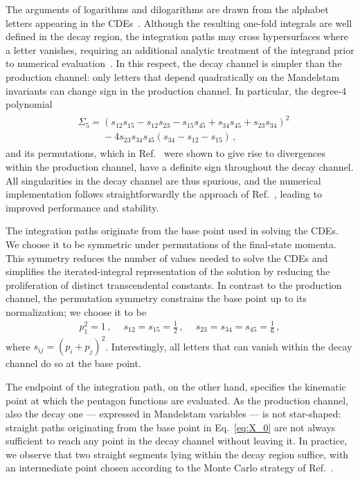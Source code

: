 \documentclass[10pt,aps,prl,superscriptaddress,twocolumn,preprintnumbers,nofootinbib]{revtex4-2}
\begin{document}
The arguments of logarithms and dilogarithms are drawn from the alphabet letters appearing in the CDEs~\cite{Duhr:2011zq}. Although the resulting one-fold integrals are well defined in the decay region, the integration paths may cross hypersurfaces where a letter vanishes, requiring an additional analytic treatment of the integrand prior to numerical evaluation~\cite{Chicherin:2021dyp}.
In this respect, the decay channel is simpler than the production channel: only letters that depend quadratically on the Mandelstam invariants can change sign in the production channel.
In particular, the degree-4 polynomial
\begin{align}
\begin{aligned}
& \Sigma_5 = (s_{12} s_{15} - s_{12} s_{23} - s_{15} s_{45} + s_{34} s_{45} + s_{23} s_{34})^2 \\
& \phantom{\Sigma_5 = } - 4 s_{23} s_{34}s_{45}(s_{34} - s_{12} - s_{15})\,,
\end{aligned}
\end{align}
and its permutations, which in Ref.~\cite{Abreu:2023rco} were shown to give rise to divergences within the production channel, have a definite sign throughout the decay channel.
All singularities in the decay channel are thus spurious, and the numerical implementation  follows straightforwardly the approach of Ref.~\cite{Chicherin:2020oor}, leading to improved performance and stability.

The integration paths originate from the base point used in solving the CDEs.
We choose it to be symmetric under permutations of the final-state momenta.
This symmetry reduces the number of values needed to solve the CDEs and simplifies the iterated-integral representation of the solution by reducing the proliferation of distinct transcendental constants.
In contrast to the production channel, the permutation symmetry constrains the base point up to its normalization;
we choose it to be
\begin{align} \label{eq:X_0}
  p_1^2 = 1 \,, \quad \ s_{12} = s_{15} = \frac12 \,, \quad \ s_{23} = s_{34} = s_{45} = \frac16 \,,
\end{align}
where $s_{ij} = (p_i+p_j)^2$.
Interestingly, all letters that can vanish within the decay channel do so at the base point.

The endpoint of the integration path, on the other hand, specifies the kinematic point at which the pentagon functions are evaluated.
As the production channel, also the decay one --- expressed in Mandelstam variables --- is not star-shaped: straight paths originating from the base point in Eq.~\eqref{eq:X_0} are not always sufficient to reach any point in the decay channel without leaving it.
In practice, we observe that two straight segments lying within the decay region suffice, with an intermediate point chosen according to the Monte Carlo strategy of Ref.~\cite{Chicherin:2021dyp}.
\end{document}
